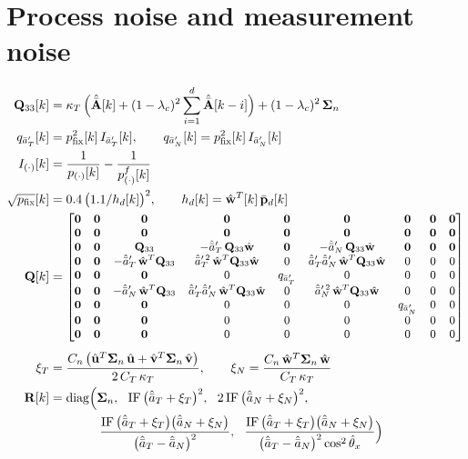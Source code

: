 \documentclass[11pt,a4paper]{ctexart}
\newcommand{\lc}{\lambda_c}
\newcommand{\bp}{\bar{\mathbf p}}
\newcommand{\Ah}{\hat{\bar{\mathbf A}}}
\newcommand{\uh}{\hat{\mathbf u}}
\newcommand{\vh}{\hat{\mathbf v}}
\newcommand{\wh}{\hat{\mathbf w}}
\newcommand{\haT}{\hat{\bar a}_T}
\newcommand{\haN}{\hat{\bar a}_N}
\newcommand{\apT}{\bar a'_T}
\newcommand{\apN}{\bar a'_N}
\newcommand{\hapT}{\hat{\bar a}'_T}
\newcommand{\hapN}{\hat{\bar a}'_N}
\newcommand{\Sn}{\boldsymbol\Sigma_n}
\newcommand{\CK}{C_T\,\kappa_T}
\newcommand{\Pfix}{p_{\mathrm{fix}}}
\begin{document}
\section{Process noise and measurement noise}
\begin{align*}
\mathbf Q_{33}[k] &= \kappa_T\,\Big(\Ah[k] + (1-\lc)^2\sum_{i=1}^{d}\Ah[k-i]\Big) + (1-\lc)^2\,\Sn \\
q_{\apT}[k] &= \Pfix^{2}[k]\,I_{\apT}[k], \qquad q_{\apN}[k] = \Pfix^{2}[k]\,I_{\apN}[k] \\
I_{(\cdot)}[k] &= \frac{1}{p_{(\cdot)}[k]} - \frac{1}{p^f_{(\cdot)}[k]} \\
\sqrt{\Pfix}[k] &= 0.4\,\big(1.1/h_d[k]\big)^{2}, \qquad h_d[k] = \wh^{T}[k]\,\bp_d[k] \\
\mathbf Q[k] &=
{\small\begin{bmatrix}
\mathbf 0 & \mathbf 0 & \mathbf 0 & \mathbf 0 & \mathbf 0 & \mathbf 0 & \mathbf 0 & \mathbf 0 & \mathbf 0 \\
\mathbf 0 & \mathbf 0 & \mathbf 0 & \mathbf 0 & \mathbf 0 & \mathbf 0 & \mathbf 0 & \mathbf 0 & \mathbf 0 \\
\mathbf 0 & \mathbf 0 & \mathbf Q_{33} & -\hapT\,\mathbf Q_{33}\wh & \mathbf 0 & -\hapN\,\mathbf Q_{33}\wh & \mathbf 0 & \mathbf 0 & \mathbf 0 \\
\mathbf 0 & \mathbf 0 & -\hapT\,\wh^{T}\mathbf Q_{33} & \hat{\bar a}_T'^{\,2}\,\wh^{T}\mathbf Q_{33}\wh & 0 & \hapT\hapN\,\wh^{T}\mathbf Q_{33}\wh & 0 & 0 & 0 \\
\mathbf 0 & \mathbf 0 & \mathbf 0 & 0 & q_{\apT} & 0 & 0 & 0 & 0 \\
\mathbf 0 & \mathbf 0 & -\hapN\,\wh^{T}\mathbf Q_{33} & \hapT\hapN\,\wh^{T}\mathbf Q_{33}\wh & 0 & \hat{\bar a}_N'^{\,2}\,\wh^{T}\mathbf Q_{33}\wh & 0 & 0 & 0 \\
\mathbf 0 & \mathbf 0 & \mathbf 0 & 0 & 0 & 0 & q_{\apN} & 0 & 0 \\
\mathbf 0 & \mathbf 0 & \mathbf 0 & 0 & 0 & 0 & 0 & 0 & 0 \\
\mathbf 0 & \mathbf 0 & \mathbf 0 & 0 & 0 & 0 & 0 & 0 & 0
\end{bmatrix}} \\[4pt]
\xi_T &= \frac{C_n\,\big(\uh^{T}\Sn\,\uh + \vh^{T}\Sn\,\vh\big)}{2\,\CK}, \qquad
\xi_N = \frac{C_n\,\wh^{T}\Sn\,\wh}{\CK} \\
\mathbf R[k] &= \mathrm{diag}\Big(\Sn,\ \ \mathrm{IF}\,\big(\haT + \xi_T\big)^2,\ \ 2\,\mathrm{IF}\,\big(\haN + \xi_N\big)^2, \\
&\qquad\qquad \frac{\mathrm{IF}\,\big(\haT + \xi_T\big)\big(\haN + \xi_N\big)}{\big(\haT - \haN\big)^2},\ \
\frac{\mathrm{IF}\,\big(\haT + \xi_T\big)\big(\haN + \xi_N\big)}{\big(\haT - \haN\big)^2\cos^2\hat\theta_x}\Big)
\end{align*}
\end{document}

